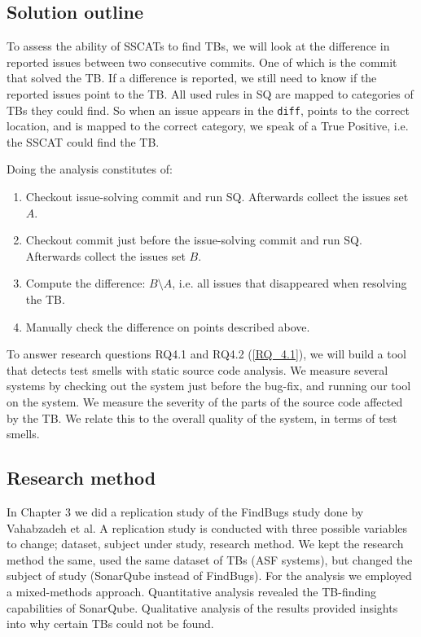 \documentclass{uvamscse}
\newcommand{\Atestbugs}{Vahabzadeh et al.}
\begin{document}
\subsection{Solution outline}
To assess the ability of SSCATs to find TBs, we will look at the difference in reported issues between two consecutive commits. One of which is the commit that solved the TB. If a difference is reported, we still need to know
if the reported issues point to the TB. All used rules in SQ are mapped to categories of TBs they could find. So when an issue appears in the \texttt{diff}, points to the correct location, and is mapped to the correct category, we speak of a True Positive, i.e. the SSCAT could find the TB.

Doing the analysis constitutes of:
\begin{enumerate}
	\item Checkout issue-solving commit and run SQ. Afterwards collect the issues set $A$.
	\item Checkout commit just before the issue-solving commit and run SQ. Afterwards collect the issues set $B$.
	\item Compute the difference: $B\setminus A$, i.e. all issues that disappeared when resolving the TB.
	\item Manually check the difference on points described above.
\end{enumerate}

To answer research questions RQ4.1 and RQ4.2 (\ref{RQ_4.1}), we will build a tool that detects test smells with static source code analysis. We measure several systems by checking out the system just before the bug-fix, and running our tool on the system. We measure the severity of the parts of the source code affected by the TB. We relate this to the overall quality of the system, in terms of test smells.
\subsection{Research method}
In Chapter 3 we did a replication study of the FindBugs study done by \Atestbugs{} A replication study is conducted with three possible variables to change; dataset, subject under study, research method. We kept the research method the same, used the same dataset of TBs (ASF systems), but changed the subject of study (SonarQube instead of FindBugs). For the analysis we employed a mixed-methods approach. Quantitative analysis revealed the TB-finding capabilities of SonarQube. Qualitative analysis of the results provided insights into why certain TBs could not be found.
\end{document}
